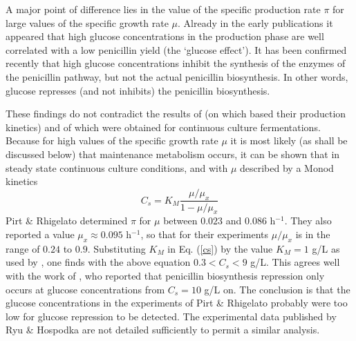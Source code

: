 \documentclass{kluwer}    %
\begin{document}
\begin{article}
A major
point of difference lies in the value of the specific production rate $\pi$ for
large values of the specific growth rate $\mu$.
Already in the early publications \cite{Falzon87}
it appeared that high glucose
concentrations in the production phase are well correlated with a
low penicillin yield (the 
`glucose effect'). It has been confirmed recently 
\cite{Bunt,Cahour-thesis,BrownAndBurton,Carr-Goldstein}
that
high glucose concentrations inhibit the synthesis of the enzymes of the
penicillin pathway, but not the actual penicillin biosynthesis.
In other words, glucose represses (and not inhibits) the penicillin
biosynthesis. 

These findings do not contradict the results of 
\citeauthor{Chin88-book} (on which  based their 
production kinetics) and of \citeyear{ChinThesis} which were obtained for
continuous culture fermentations.                
Because for high values of the specific
growth rate $\mu$ it is most likely (as shall be discussed below) that 
maintenance metabolism occurs, it can be shown that
in steady state continuous culture conditions, and with $\mu$ described by a Monod kinetics
\begin{equation}
    C_{s}  =  K_{M} \frac{\mu/\mu_{x}}{1-\mu/\mu_{x}} \label{cs}
\end{equation}
Pirt \& Rhigelato determined $\pi$ for $\mu$ between 
$0.023$ and $0.086$ h$^{-1}$.
They also reported a value $\mu_{x} \approx 0.095$
h$^{-1}$, so that for their experiments $\mu/\mu_{x}$ is in the range 
of $0.24$ to $0.9$. 
Substituting $K _M$ in Eq. (\ref{cs}) by 
the value $K_{M}=1$ g/L as used by \cite{Bunt}, one finds
with the above equation $0.3 < C_{s} < 9$ g/L. This agrees well with 
the work of  , who reported that penicillin biosynthesis 
repression only occurs at glucose concentrations from $C_{s}=10$ g/L on.
The conclusion is that the glucose concentrations in the experiments of 
Pirt \& Rhigelato probably were too low for glucose repression to be 
detected. The experimental data published by Ryu \& Hospodka 
are not detailed sufficiently to permit a similar analysis.




\end{article}
\end{document}
